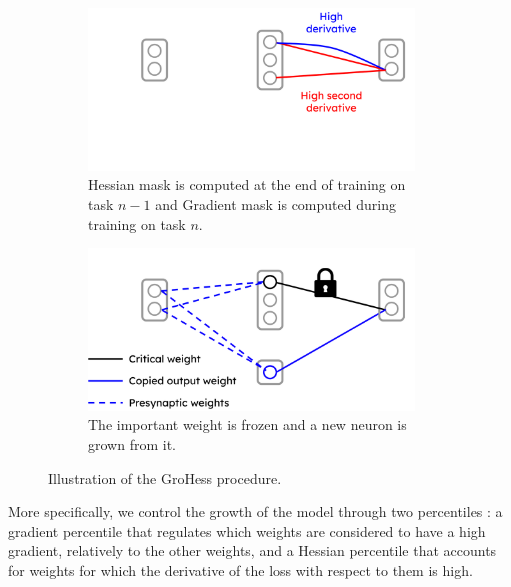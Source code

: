 \documentclass[11pt]{article}
\begin{document}
\begin{figure}
    \centering
    \begin{subfigure}[b]{0.4\textwidth}
        \begin{center}
        \includegraphics[width=0.95\textwidth]{images/GroHess_explication_1.png}
        \end{center}
        \caption{Hessian mask is computed at the end of training on task $n-1$ and Gradient mask is computed during training on task $n$.}
        \label{fig:GroHess_explication_1}
    \end{subfigure}
    \hspace{3mm}
    \begin{subfigure}[b]{0.4\textwidth}
        \begin{center}
        \includegraphics[width=0.95\textwidth]{images/GroHess_explication_2.png}
        \end{center}
        \caption{The important weight is frozen and a new neuron is grown from it.\\}
        \label{fig:GroHess_explication_2}
    \end{subfigure}
    \caption{Illustration of the GroHess procedure.}
\end{figure}

More specifically, we control the growth of the model through two percentiles : a gradient percentile that regulates which weights are considered to have a high gradient, relatively to the other weights, and a Hessian percentile that accounts for weights for which the derivative of the loss with respect to them is high.
\end{document}
